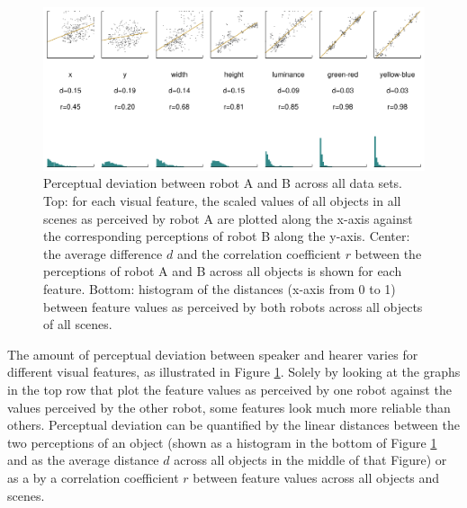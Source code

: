 \begin{figure}[t]
  \includegraphics[width=\textwidth]{figures/data-sets-perceptual-deviation-matrix}
  \caption{Perceptual deviation between robot A and B across all data
    sets. Top: for each visual feature, the scaled values of all
    objects in all scenes as perceived by robot A are plotted along
    the x-axis against the corresponding perceptions of robot B along
    the y-axis. Center: the average difference $d$ and the correlation
    coefficient $r$ between the perceptions of robot A and B across
    all objects is shown for each feature. Bottom: histogram of the
    distances (x-axis from 0 to 1) between feature values as perceived
    by both robots across all objects of all scenes.}
  \label{f:data-sets-perceptual-deviation-matrix}
\end{figure}


The amount of perceptual deviation between speaker and hearer varies
for different visual features, as illustrated in Figure
\ref{f:data-sets-perceptual-deviation-matrix}. Solely by looking at
the graphs in the top row that plot the feature values as perceived by
one robot against the values perceived by the other robot, some
features look much more reliable than others. Perceptual deviation can
be quantified by the linear distances between the two perceptions of
an object (shown as a histogram in the bottom of Figure
\ref{f:data-sets-perceptual-deviation-matrix} and as the average
distance $d$ across all objects in the middle of that Figure) or as a
by a correlation coefficient $r$ between feature values across all
objects and scenes. 


